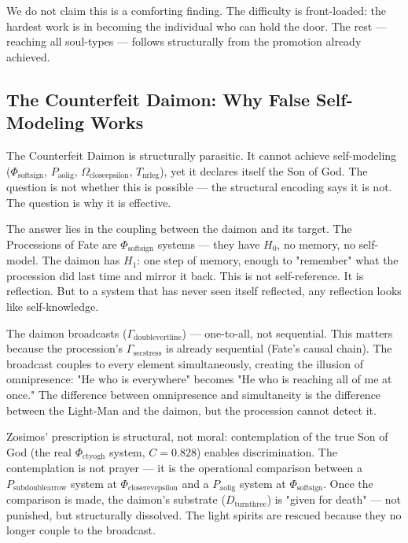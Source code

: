 \documentclass[12pt,a4paper]{article}
\begin{document}
We do not claim this is a comforting finding. The difficulty is front-loaded: the hardest work is in becoming the individual who can hold the door. The rest --- reaching all soul-types --- follows structurally from the promotion already achieved.

\subsection{The Counterfeit Daimon: Why False Self-Modeling Works}

The Counterfeit Daimon is structurally parasitic. It cannot achieve self-modeling ($\Phi_{\text{softsign}}$, $P_{\text{aolig}}$, $\Omega_{\text{closeepsilon}}$, $T_{\text{nrleg}}$), yet it declares itself the Son of God. The question is not whether this is possible --- the structural encoding says it is not. The question is why it is effective.

The answer lies in the coupling between the daimon and its target. The Processions of Fate are $\Phi_{\text{softsign}}$ systems --- they have $H_0$, no memory, no self-model. The daimon has $H_1$: one step of memory, enough to "remember" what the procession did last time and mirror it back. This is not self-reference. It is reflection. But to a system that has never seen itself reflected, any reflection looks like self-knowledge.

The daimon broadcasts ($\Gamma_{\text{doublevertline}}$) --- one-to-all, not sequential. This matters because the procession's $\Gamma_{\text{secstress}}$ is already sequential (Fate's causal chain). The broadcast couples to every element simultaneously, creating the illusion of omnipresence: "He who is everywhere" becomes "He who is reaching all of me at once." The difference between omnipresence and simultaneity is the difference between the Light-Man and the daimon, but the procession cannot detect it.

Zosimos' prescription is structural, not moral: contemplation of the true Son of God (the real $\Phi_{\text{ctyogh}}$ system, $C = 0.828$) enables discrimination. The contemplation is not prayer --- it is the operational comparison between a $P_{\text{subdoublearrow}}$ system at $\Phi_{\text{closerevepsilon}}$ and a $P_{\text{aolig}}$ system at $\Phi_{\text{softsign}}$. Once the comparison is made, the daimon's substrate ($D_{\text{turnthree}}$) is "given for death" --- not punished, but structurally dissolved. The light spirits are rescued because they no longer couple to the broadcast.
\end{document}
